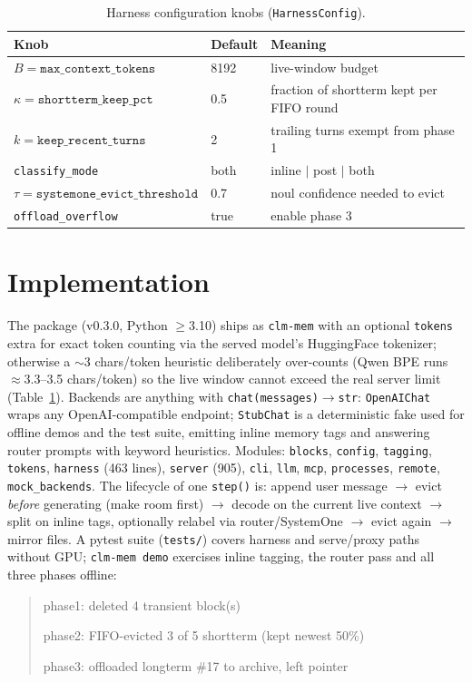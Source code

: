 \documentclass[10pt]{article}
\begin{document}
\begin{table}[htbp]
\centering\small
\begin{tabular}{lll}
\hline
Knob & Default & Meaning\\
\hline
$B=\texttt{max\_context\_tokens}$ & 8192 & live-window budget\\
$\kappa=\texttt{shortterm\_keep\_pct}$ & 0.5 & fraction of shortterm kept per FIFO round\\
$k=\texttt{keep\_recent\_turns}$ & 2 & trailing turns exempt from phase 1\\
\texttt{classify\_mode} & both & inline $\vert$ post $\vert$ both\\
$\tau=\texttt{systemone\_evict\_threshold}$ & 0.7 & noul confidence needed to evict\\
\texttt{offload\_overflow} & true & enable phase 3\\
\hline
\end{tabular}
\caption{Harness configuration knobs (\texttt{HarnessConfig}).}\label{tab:knobs}
\end{table}

\section{Implementation}
The package (v0.3.0, Python $\geq$3.10) ships as \texttt{clm-mem} with an optional \texttt{tokens} extra for exact token counting via the served model's HuggingFace tokenizer; otherwise a $\sim$3 chars/token heuristic deliberately over-counts (Qwen BPE runs $\approx$3.3--3.5 chars/token) so the live window cannot exceed the real server limit (Table~\ref{tab:knobs}). Backends are anything with \texttt{chat(messages)$\to$str}: \texttt{OpenAIChat} wraps any OpenAI-compatible endpoint; \texttt{StubChat} is a deterministic fake used for offline demos and the test suite, emitting inline memory tags and answering router prompts with keyword heuristics. Modules: \texttt{blocks}, \texttt{config}, \texttt{tagging}, \texttt{tokens}, \texttt{harness} (463 lines), \texttt{server} (905), \texttt{cli}, \texttt{llm}, \texttt{mcp}, \texttt{processes}, \texttt{remote}, \texttt{mock\_backends}. The lifecycle of one \texttt{step()} is: append user message $\to$ evict \emph{before} generating (make room first) $\to$ decode on the current live context $\to$ split on inline tags, optionally relabel via router/SystemOne $\to$ evict again $\to$ mirror files. A pytest suite (\texttt{tests/}) covers harness and serve/proxy paths without GPU; \texttt{clm-mem demo} exercises inline tagging, the router pass and all three phases offline:
\begin{quote}\small\ttfamily
[evict] phase1: deleted 4 transient block(s)\par
[evict] phase2: FIFO-evicted 3 of 5 shortterm (kept newest 50\%)\par
[evict] phase3: offloaded longterm \#17 to archive, left pointer
\end{quote}
\end{document}

